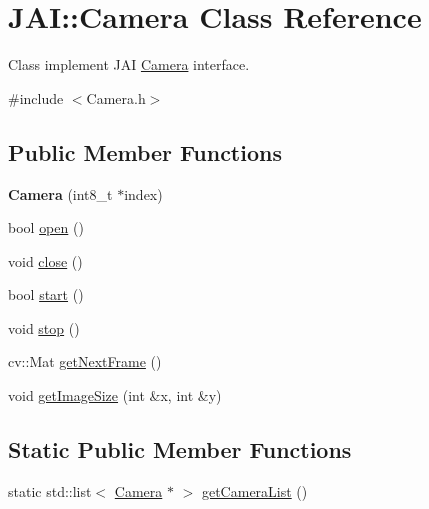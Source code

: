 \hypertarget{class_j_a_i_1_1_camera}{\section{J\-A\-I\-:\-:Camera Class Reference}
\label{class_j_a_i_1_1_camera}
}


Class implement J\-A\-I \hyperlink{class_j_a_i_1_1_camera}{Camera} interface.  




{\ttfamily \#include $<$Camera.\-h$>$}

\subsection*{Public Member Functions}
\begin{DoxyCompactItemize}
\item 
\hypertarget{class_j_a_i_1_1_camera_a85bf54a6d936d9d57c03aac12d1c26e1}{{\bfseries Camera} (int8\-\_\-t $\ast$index)}\label{class_j_a_i_1_1_camera_a85bf54a6d936d9d57c03aac12d1c26e1}

\item 
bool \hyperlink{class_j_a_i_1_1_camera_a721fd6f5f51eaa6c6fffa011156837f2}{open} ()
\item 
void \hyperlink{class_j_a_i_1_1_camera_a19b8e56ddba3acc0f7f963360418bf44}{close} ()
\item 
bool \hyperlink{class_j_a_i_1_1_camera_a0ada0a38ccf73515b68dfa813c629a73}{start} ()
\item 
void \hyperlink{class_j_a_i_1_1_camera_ae6c6aeaf70ad261f3c188c50e8701b0b}{stop} ()
\item 
cv\-::\-Mat \hyperlink{class_j_a_i_1_1_camera_a87db8a92842cd44b6f56e32ace2cee56}{get\-Next\-Frame} ()
\item 
void \hyperlink{class_j_a_i_1_1_camera_a763cae701a82b3356be061a0f4a7bdc3}{get\-Image\-Size} (int \&x, int \&y)
\end{DoxyCompactItemize}
\subsection*{Static Public Member Functions}
\begin{DoxyCompactItemize}
\item 
static std\-::list$<$ \hyperlink{class_j_a_i_1_1_camera}{Camera} $\ast$ $>$ \hyperlink{class_j_a_i_1_1_camera_abf0561e5508ed968e59cec9b6cee80c2}{get\-Camera\-List} ()
\end{DoxyCompactItemize}


